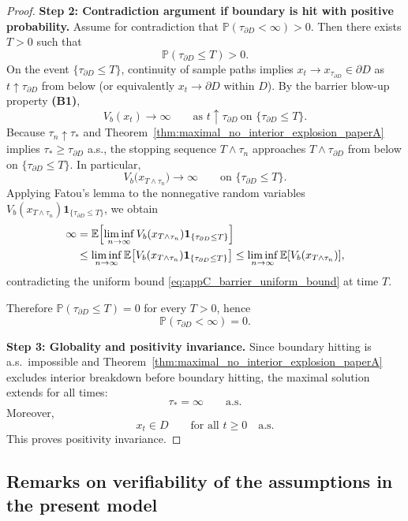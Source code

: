 \documentclass[pdflatex,sn-mathphys-ay]{sn-jnl}
\theoremstyle{thmstyleone}
\theoremstyle{definition}
\theoremstyle{remark}
\begin{document}
\begin{appendices}
\begin{proof}
\medskip
\noindent\textbf{Step 2: Contradiction argument if boundary is hit with positive probability.}
Assume for contradiction that \(\mathbb P(\tau_{\partial D}<\infty)>0\). Then there exists \(T>0\) such that
\[
\mathbb P(\tau_{\partial D}\le T)>0.
\]
On the event \(\{\tau_{\partial D}\le T\}\), continuity of sample paths implies \(x_t\to x_{\tau_{\partial D}}\in\partial D\) as \(t\uparrow \tau_{\partial D}\) from below (or equivalently \(x_t\to \partial D\) within \(D\)). By the barrier blow-up property \textbf{(B1)},
\[
V_b(x_t)\to\infty\qquad \text{as }t\uparrow \tau_{\partial D}\ \text{on }\{\tau_{\partial D}\le T\}.
\]
Because \(\tau_n\uparrow \tau_*\) and Theorem~\ref{thm:maximal_no_interior_explosion_paperA} implies \(\tau_*\ge \tau_{\partial D}\) a.s., the stopping sequence \(T\wedge \tau_n\) approaches \(T\wedge \tau_{\partial D}\) from below on \(\{\tau_{\partial D}\le T\}\). In particular,
\begin{equation}
\label{eq:appC_barrier_divergence}
V_b\bigl(x_{T\wedge \tau_n}\bigr)\to\infty
\qquad\text{on }\{\tau_{\partial D}\le T\}.
\end{equation}
Applying Fatou's lemma to the nonnegative random variables \(V_b(x_{T\wedge \tau_n})\mathbf 1_{\{\tau_{\partial D}\le T\}}\), we obtain
\begin{align}
\infty
&=
\mathbb E\!\left[\liminf_{n\to\infty}V_b(x_{T\wedge \tau_n})\mathbf 1_{\{\tau_{\partial D}\le T\}}\right] \notag\\
&\le
\liminf_{n\to\infty}\mathbb E\!\left[V_b(x_{T\wedge \tau_n})\mathbf 1_{\{\tau_{\partial D}\le T\}}\right]
\le
\liminf_{n\to\infty}\mathbb E[V_b(x_{T\wedge \tau_n})],
\label{eq:appC_fatou_contradiction}
\end{align}
contradicting the uniform bound \eqref{eq:appC_barrier_uniform_bound} at time \(T\).

Therefore \(\mathbb P(\tau_{\partial D}\le T)=0\) for every \(T>0\), hence
\[
\mathbb P(\tau_{\partial D}<\infty)=0.
\]

\medskip
\noindent\textbf{Step 3: Globality and positivity invariance.}
Since boundary hitting is a.s.\ impossible and Theorem~\ref{thm:maximal_no_interior_explosion_paperA} excludes interior breakdown before boundary hitting, the maximal solution extends for all times:
\[
\tau_*=\infty\qquad\text{a.s.}
\]
Moreover,
\[
x_t\in D\qquad \text{for all }t\ge0\quad\text{a.s.}
\]
This proves positivity invariance.
\end{proof}

\subsection{Remarks on verifiability of the assumptions in the present model}
\label{appC:assumption_verification_remarks}


\end{appendices}
\end{document}
